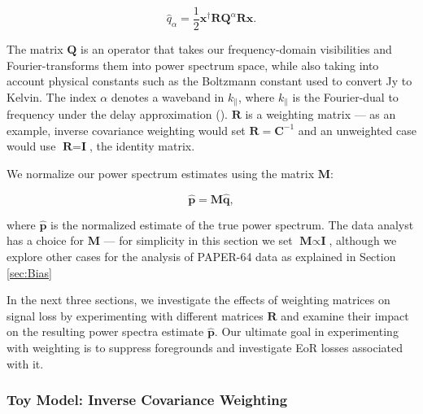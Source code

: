 \documentclass[preprint2,numberedappendix,tighten]{aastex6}  %
\begin{document}
\begin{equation}
\label{eq:qhat}
\hat{q}_{\alpha} = \frac{1}{2}\textbf{x}^{\dagger}\textbf{R}\textbf{Q}^{\alpha}\textbf{R}\textbf{x}.
\end{equation}

\noindent The matrix $\textbf{Q}$ is an operator that takes our frequency-domain visibilities and Fourier-transforms them into power spectrum space, while also taking into account physical constants such as the Boltzmann constant used to convert Jy to Kelvin. The index $\alpha$ denotes a waveband in $k_{\parallel}$, where $k_{\parallel}$ is the Fourier-dual to frequency under the delay approximation (\citealt{parsons_et_al2012b}). $\textbf{R}$ is a weighting matrix --- as an example, inverse covariance weighting would set $\textbf{R} = \textbf{C}^{-1}$ and an unweighted case would use $\textbf{R} = \textbf{I}$, the identity matrix.

We normalize our power spectrum estimates using the matrix $\textbf{M}$:

\begin{equation}
\label{eq:phat}
\hat{\textbf{p}} = \textbf{M}\hat{\textbf{q}},
\end{equation}

\noindent where $\hat{\textbf{p}}$ is the normalized estimate of the true power spectrum. The data analyst has a choice for $\textbf{M}$ --- for simplicity in this section we set $\textbf{M} \propto \textbf{I}$, although we explore other cases for the analysis of PAPER-64 data as explained in Section \ref{sec:Bias}

In the next three sections, we investigate the effects of weighting matrices on signal loss by experimenting with different matrices $\textbf{R}$ and examine their impact on the resulting power spectra estimate $\hat{\textbf{p}}$. Our ultimate goal in experimenting with weighting is to suppress foregrounds and investigate EoR losses associated with it.

\subsubsection{Toy Model: Inverse Covariance Weighting}
\label{sec:toymodel}
\end{document}
